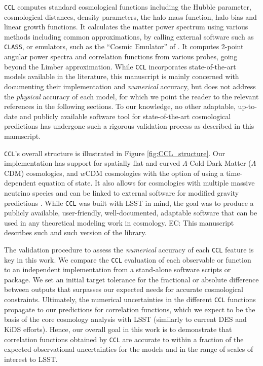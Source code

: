 \documentclass[\docopts]{\docclass}
\newcommand{\elisa}[1]{\textcolor{green!10!orange!90!}{EC: #1}}
\newcommand{\ccl}{{\tt CCL}\xspace}
\newcommand{\class}{{\tt CLASS}\xspace}
\newcommand{\hiclass}{{\tt hi$\_$CLASS\xspace}}
\begin{document}
\ccl computes standard cosmological functions including the Hubble parameter, cosmological distances, density parameters, the halo mass function, halo bias and linear growth functions. It calculates the matter power spectrum using various methods including common approximations, by calling external software such as \class \citep{class}, or emulators, such as the ``Cosmic Emulator'' of \citet{Lawrence17}. It computes 2-point angular power spectra and correlation functions from various probes, going beyond the Limber approximation. While \ccl incorporates state-of-the-art models available in the literature, this manuscript is mainly concerned with documenting their implementation and {\it numerical} accuracy, but does not address the {\it physical} accuracy of each model, for which we point the reader to the relevant references in the following sections. To our knowledge, no other adaptable, up-to-date and publicly available software tool for state-of-the-art cosmological predictions has undergone such a rigorous validation process as described in this manuscript.

\ccl 's overall structure is illustrated in Figure \ref{fig:CCL_structure}. Our implementation has support for spatially flat and curved $\Lambda$-Cold Dark Matter ($\Lambda$CDM) cosmologies, and $w$CDM cosmologies with the option of using a time-dependent equation of state. It also allows for cosmologies with multiple massive neutrino species and can be linked to external software for modified gravity predictions \citep[\hiclass,][]{Zumalacarregui17}. While \ccl was built with LSST in mind, the goal was to produce a publicly available, user-friendly, well-documented, adaptable software that can be used in any theoretical modeling work in cosmology. \elisa{This manuscript describes such and such version of the library.} 

The validation procedure to assess the {\it numerical} accuracy of each \ccl feature is key in this work. We compare the \ccl evaluation of each observable or function to an independent implementation from a stand-alone software scripts or package. We set an initial target tolerance for the fractional or absolute difference between outputs that surpasses our expected needs for accurate cosmological constraints. Ultimately, the numerical uncertainties in the different \ccl functions propagate to our predictions for correlation functions, which we expect to be the basis of the core cosmology analysis with LSST (similarly to current DES and KiDS efforts). Hence, our overall goal in this work is to demonstrate that correlation functions obtained by \ccl are accurate to within a fraction of the expected observational uncertainties for the models and in the range of scales of interest to LSST.
\end{document}
